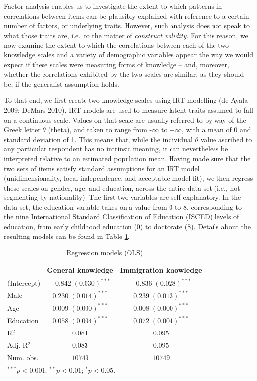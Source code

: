 \documentclass[12pt,halfline,a4paper,]{ouparticle}
\begin{document}
Factor analysis enables us to investigate the extent to which patterns
in correlations between items can be plausibly explained with reference
to a certain number of factors, or underlying traits. However, such
analysis does not speak to what those traits are, i.e.~to the matter of
\emph{construct validity}. For this reason, we now examine the extent to
which the correlations between each of the two knowledge scales and a
variety of demographic variables appear the way we would expect if these
scales were measuring forms of knowledge -- and, moreover, whether the
correlations exhibited by the two scales are similar, as they should be,
if the generalist assumption holds.

To that end, we first create two knowledge scales using IRT modelling
(de Ayala 2009; DeMars 2010). IRT models are used to measure latent
traits assumed to fall on a continuous scale. Values on that scale are
usually referred to by way of the Greek letter \(\theta\) (theta), and
taken to range from -\(\infty\) to +\(\infty\), with a mean of 0 and
standard deviation of 1. This means that, while the individual
\(\theta\) value ascribed to any particular respondent has no intrinsic
meaning, it can nevertheless be interpreted relative to an estimated
population mean. Having made sure that the two sets of items satisfy
standard assumptions for an IRT model (unidimensionality, local
independence, and acceptable model fit), we then regress these scales on
gender, age, and education, across the entire data set (i.e., not
segmenting by nationality). The first two variables are
self-explanatory. In the data set, the education variable takes on a
value from 0 to 8, corresponding to the nine International Standard
Classification of Education (ISCED) levels of education, from early
childhood education (0) to doctorate (8). Details about the resulting
models can be found in Table \ref{tab:4}.

\begin{table}[h!]
\caption{Regression models (OLS)}
\begin{center}
\begin{tabular}{l c c}
\hline
 & General knowledge & Immigration knowledge \\
\hline
(Intercept) & $-0.842 \; (0.030)^{***}$ & $-0.836 \; (0.028)^{***}$ \\
Male        & $0.230 \; (0.014)^{***}$  & $0.239 \; (0.013)^{***}$  \\
Age         & $0.009 \; (0.000)^{***}$  & $0.008 \; (0.000)^{***}$  \\
Education   & $0.058 \; (0.004)^{***}$  & $0.072 \; (0.004)^{***}$  \\
\hline
R$^2$       & $0.084$                   & $0.095$                   \\
Adj. R$^2$  & $0.083$                   & $0.095$                   \\
Num. obs.   & $10749$                   & $10749$                   \\
\hline
\multicolumn{3}{l}{\scriptsize{$^{***}p<0.001$; $^{**}p<0.01$; $^{*}p<0.05$.}}
\end{tabular}
\label{tab:4}
\end{center}
\end{table}
\end{document}
